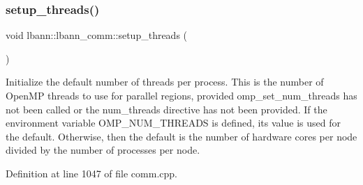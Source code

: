 \subsubsection{\texorpdfstring{setup\+\_\+threads()}{setup\_threads()}}
{\footnotesize\ttfamily void lbann\+::lbann\+\_\+comm\+::setup\+\_\+threads (\begin{DoxyParamCaption}{ }\end{DoxyParamCaption})\hspace{0.3cm}{\ttfamily [private]}}

Initialize the default number of threads per process. This is the number of Open\+MP threads to use for parallel regions, provided omp\+\_\+set\+\_\+num\+\_\+threads has not been called or the num\+\_\+threads directive has not been provided. If the environment variable O\+M\+P\+\_\+\+N\+U\+M\+\_\+\+T\+H\+R\+E\+A\+DS is defined, it\textquotesingle{}s value is used for the default. Otherwise, then the default is the number of hardware cores per node divided by the number of processes per node. 

Definition at line 1047 of file comm.\+cpp.



